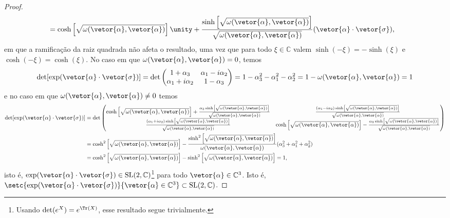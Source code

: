 \begin{proof}
\begin{align*}
        &= \cosh\left[\sqrt{\omega(\vetor{\alpha},\vetor{\alpha})}\right] \unity + \frac{\sinh\left[\sqrt{\omega(\vetor{\alpha}, \vetor{\alpha})}\right]}{\sqrt{\omega(\vetor{\alpha},\vetor{\alpha})}}(\vetor{\alpha}\cdot\vetor{\sigma}),
    \end{align*}
    em que a ramificação da raiz quadrada não afeta o resultado, uma vez que para todo \(\xi \in \mathbb{C}\) valem \(\sinh(-\xi) = -\sinh(\xi)\) e \(\cosh(-\xi) = \cosh(\xi)\).
    No caso em que \(\omega(\vetor{\alpha}, \vetor{\alpha}) = 0\), temos
    \begin{equation*}
        \det[\exp(\vetor{\alpha}\cdot\vetor{\sigma})] = \det \begin{pmatrix}
            1 + \alpha_3 & \alpha_1 - i \alpha_2\\
            \alpha_1 + i \alpha_2 & 1 - \alpha_3
        \end{pmatrix} = 1 - \alpha_3^2 - \alpha_1^2 - \alpha_2^2 = 1 - \omega(\vetor{\alpha}, \vetor{\alpha}) = 1
    \end{equation*}
    e no caso em que \(\omega(\vetor{\alpha}, \vetor{\alpha}) \neq 0\) temos
    \begin{align*}
        \det[\exp(\vetor{\alpha}\cdot\vetor{\sigma})]
        &= \det \begin{pmatrix}
            \cosh\left[\sqrt{\omega(\vetor{\alpha},\vetor{\alpha})}\right] + \frac{\alpha_3 \sinh\left[\sqrt{\omega(\vetor{\alpha},\vetor{\alpha})}\right]}{\sqrt{\omega(\vetor{\alpha},\vetor{\alpha})}} & \frac{(\alpha_1 - i \alpha_2) \sinh\left[\sqrt{\omega(\vetor{\alpha},\vetor{\alpha})}\right]}{\sqrt{\omega(\vetor{\alpha},\vetor{\alpha})}}\\
            \frac{(\alpha_1 + i \alpha_2) \sinh\left[\sqrt{\omega(\vetor{\alpha},\vetor{\alpha})}\right]}{\sqrt{\omega(\vetor{\alpha},\vetor{\alpha})}} & \cosh\left[\sqrt{\omega(\vetor{\alpha},\vetor{\alpha})}\right] - \frac{\alpha_3 \sinh\left[\sqrt{\omega(\vetor{\alpha},\vetor{\alpha})}\right]}{\sqrt{\omega(\vetor{\alpha},\vetor{\alpha})}}\\
        \end{pmatrix}\\
        &= \cosh^2\left[\sqrt{\omega(\vetor{\alpha},\vetor{\alpha})}\right] - \frac{\sinh^2\left[\sqrt{\omega(\vetor{\alpha},\vetor{\alpha})}\right]}{\omega(\vetor{\alpha}, \vetor{\alpha})}(\alpha_3^2 + \alpha_1^2 + \alpha_2^2)\\
        &= \cosh^2\left[\sqrt{\omega(\vetor{\alpha},\vetor{\alpha})}\right] - \sinh^2\left[\sqrt{\omega(\vetor{\alpha},\vetor{\alpha})}\right] = 1,
    \end{align*}
    isto é, \(\exp(\vetor{\alpha}\cdot \vetor{\sigma}) \in \mathrm{SL}(2, \mathbb{C})\)\footnote{Usando \(\det(e^X) = e^{\Tr(X)}\), esse resultado segue trivialmente.} para todo \(\vetor{\alpha} \in \mathbb{C}^3\). Isto é, \(\setc{\exp(\vetor{\alpha}\cdot\vetor{\sigma})}{\vetor{\alpha} \in \mathbb{C}^3} \subset \mathrm{SL}(2,\mathbb{C})\).


\end{proof}
